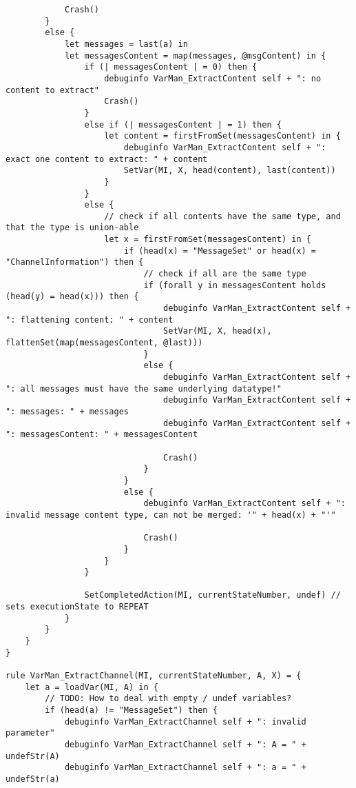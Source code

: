 \begin{listing}[H]
\begin{verbatim}
            Crash()
        }
        else {
            let messages = last(a) in
            let messagesContent = map(messages, @msgContent) in {
                if (| messagesContent | = 0) then {
                    debuginfo VarMan_ExtractContent self + ": no content to extract"
                    Crash()
                }
                else if (| messagesContent | = 1) then {
                    let content = firstFromSet(messagesContent) in {
                        debuginfo VarMan_ExtractContent self + ": exact one content to extract: " + content
                        SetVar(MI, X, head(content), last(content))
                    }
                }
                else {
                    // check if all contents have the same type, and that the type is union-able
                    let x = firstFromSet(messagesContent) in {
                        if (head(x) = "MessageSet" or head(x) = "ChannelInformation") then {
                            // check if all are the same type
                            if (forall y in messagesContent holds (head(y) = head(x))) then {
                                debuginfo VarMan_ExtractContent self + ": flattening content: " + content
                                SetVar(MI, X, head(x), flattenSet(map(messagesContent, @last)))
                            }
                            else {
                                debuginfo VarMan_ExtractContent self + ": all messages must have the same underlying datatype!"
                                debuginfo VarMan_ExtractContent self + ": messages: " + messages
                                debuginfo VarMan_ExtractContent self + ": messagesContent: " + messagesContent

                                Crash()
                            }
                        }
                        else {
                            debuginfo VarMan_ExtractContent self + ": invalid message content type, can not be merged: '" + head(x) + "'"

                            Crash()
                        }
                    }
                }

                SetCompletedAction(MI, currentStateNumber, undef) // sets executionState to REPEAT
            }
        }
    }
}

rule VarMan_ExtractChannel(MI, currentStateNumber, A, X) = {
    let a = loadVar(MI, A) in {
        // TODO: How to deal with empty / undef variables?
        if (head(a) != "MessageSet") then {
            debuginfo VarMan_ExtractChannel self + ": invalid parameter"
            debuginfo VarMan_ExtractChannel self + ": A = " + undefStr(A)
            debuginfo VarMan_ExtractChannel self + ": a = " + undefStr(a)


\end{verbatim}
\end{listing}
